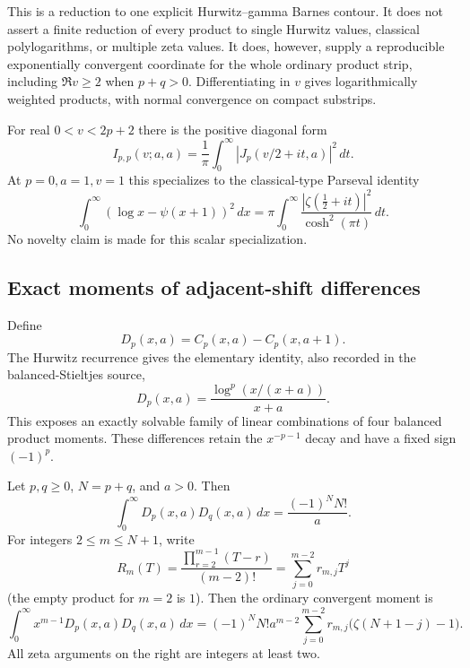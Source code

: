 This is a reduction to one explicit Hurwitz--gamma Barnes contour.
It does not assert a finite reduction of every product to single Hurwitz
values, classical polylogarithms, or multiple zeta values.  It does,
however, supply a reproducible exponentially convergent coordinate for
the whole ordinary product strip, including $\Re v\geq2$ when $p+q>0$.
Differentiating in $v$ gives logarithmically weighted products, with
normal convergence on compact substrips.

For real $0<v<2p+2$ there is the positive diagonal form
\[
 I_{p,p}(v;a,a)=\frac1\pi\int_0^\infty
        |J_p(v/2+it,a)|^2\,dt.
\]
At $p=0,a=1,v=1$ this specializes to the classical-type Parseval identity
\[
 \int_0^\infty(\log x-\psi(x+1))^2\,dx
 =\pi\int_0^\infty\frac{|\zeta(\tfrac12+it)|^2}
                              {\cosh^2(\pi t)}\,dt.
\]
No novelty claim is made for this scalar specialization.

\subsection{Exact moments of adjacent-shift differences}

Define
\[
 D_p(x,a)=C_p(x,a)-C_p(x,a+1).
\]
The Hurwitz recurrence gives the elementary identity, also recorded in
the balanced-Stieltjes source,
\begin{equation}\label{stbil:D}
 D_p(x,a)=\frac{\log^p(x/(x+a))}{x+a}.
\end{equation}
This exposes an exactly solvable family of linear combinations of four
balanced product moments.  These differences retain the $x^{-p-1}$
decay and have a fixed sign $(-1)^p$.

\begin{theorem}\label{stbil:integer-moments}
Let $p,q\geq0$, $N=p+q$, and $a>0$.  Then
\begin{equation}\label{stbil:factorial}
 \int_0^\infty D_p(x,a)D_q(x,a)\,dx
       =\frac{(-1)^N N!}{a}.
\end{equation}
For integers $2\leq m\leq N+1$, write
\[
 R_m(T)=\frac{\prod_{r=2}^{m-1}(T-r)}{(m-2)!}
       =\sum_{j=0}^{m-2}r_{m,j}T^j
\]
(the empty product for $m=2$ is $1$).  Then the ordinary convergent moment is
\begin{equation}\label{stbil:integer}
 \int_0^\infty x^{m-1}D_p(x,a)D_q(x,a)\,dx
 =(-1)^N N!a^{m-2}
       \sum_{j=0}^{m-2}r_{m,j}\bigl(\zeta(N+1-j)-1\bigr).
\end{equation}
All zeta arguments on the right are integers at least two.
\end{theorem}

